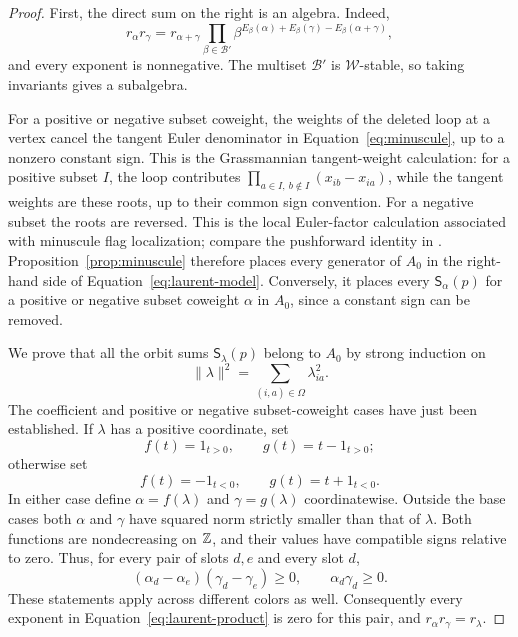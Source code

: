 \begin{proof}
First, the direct sum on the right is an algebra.  Indeed,
\begin{equation}\label{eq:laurent-product}
 r_\alpha r_\gamma
 =r_{\alpha+\gamma}
  \prod_{\beta\in\mathcal B'}
   \beta^{E_\beta(\alpha)+E_\beta(\gamma)-E_\beta(\alpha+\gamma)},
\end{equation}
and every exponent is nonnegative.  The multiset $\mathcal B'$ is
$\mathcal W$-stable, so taking invariants gives a subalgebra.

For a positive or negative subset coweight, the weights of the deleted
loop at a vertex cancel the tangent Euler denominator in
Equation~\eqref{eq:minuscule}, up to a nonzero constant sign.  This is the
Grassmannian tangent-weight calculation: for a positive subset $I$,
the loop contributes
$\prod_{a\in I,\ b\notin I}(x_{ib}-x_{ia})$, while the tangent weights
are these roots, up to their common sign convention.  For a negative
subset the roots are reversed.  This is the local Euler-factor calculation
associated with minuscule flag localization; compare the pushforward
identity in \cite[Lemma~2.10]{Weekes19}.
Proposition~\ref{prop:minuscule} therefore
places every generator of $A_0$ in the right-hand side of
Equation~\eqref{eq:laurent-model}.  Conversely, it places every
$\mathsf S_\alpha(p)$ for a positive or negative subset coweight
$\alpha$ in $A_0$, since a constant sign can be removed.

We prove that all the orbit sums $\mathsf S_\lambda(p)$ belong to $A_0$
by strong induction on
\[
 \|\lambda\|^2=\sum_{(i,a)\in\Omega}\lambda_{ia}^2.
\]
The coefficient and positive or negative subset-coweight cases have
just been established.
If $\lambda$ has a positive coordinate, set
\[
 f(t)=1_{t>0},\qquad g(t)=t-1_{t>0};
\]
otherwise set
\[
 f(t)=-1_{t<0},\qquad g(t)=t+1_{t<0}.
\]
In either case define $\alpha=f(\lambda)$ and $\gamma=g(\lambda)$
coordinatewise.  Outside the base cases both $\alpha$ and $\gamma$
have squared norm strictly smaller than that of $\lambda$.
Both functions are nondecreasing on $\mathbb Z$, and their values have
compatible signs relative to zero.  Thus, for every pair of slots
$d,e$ and every slot $d$,
\[
 (\alpha_d-\alpha_e)(\gamma_d-\gamma_e)\geq0,
 \qquad \alpha_d\gamma_d\geq0.
\]
These statements apply across different colors as well.  Consequently
every exponent in Equation~\eqref{eq:laurent-product} is zero for this
pair, and $r_\alpha r_\gamma=r_\lambda$.


\end{proof}
